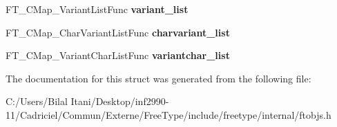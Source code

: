 \begin{DoxyCompactItemize}
\item 
F\+T\+\_\+\+C\+Map\+\_\+\+Variant\+List\+Func {\bfseries variant\+\_\+list}\hypertarget{struct_f_t___c_map___class_rec___ad61635444cbfc71c4259e74cb892c172}{}\label{struct_f_t___c_map___class_rec___ad61635444cbfc71c4259e74cb892c172}

\item 
F\+T\+\_\+\+C\+Map\+\_\+\+Char\+Variant\+List\+Func {\bfseries charvariant\+\_\+list}\hypertarget{struct_f_t___c_map___class_rec___a65db9dfa0e29b7de257dc8870532ab19}{}\label{struct_f_t___c_map___class_rec___a65db9dfa0e29b7de257dc8870532ab19}

\item 
F\+T\+\_\+\+C\+Map\+\_\+\+Variant\+Char\+List\+Func {\bfseries variantchar\+\_\+list}\hypertarget{struct_f_t___c_map___class_rec___ac1563590a0bac99082aa0996b94aad57}{}\label{struct_f_t___c_map___class_rec___ac1563590a0bac99082aa0996b94aad57}

\end{DoxyCompactItemize}


The documentation for this struct was generated from the following file\+:\begin{DoxyCompactItemize}
\item 
C\+:/\+Users/\+Bilal Itani/\+Desktop/inf2990-\/11/\+Cadriciel/\+Commun/\+Externe/\+Free\+Type/include/freetype/internal/ftobjs.\+h\end{DoxyCompactItemize}
